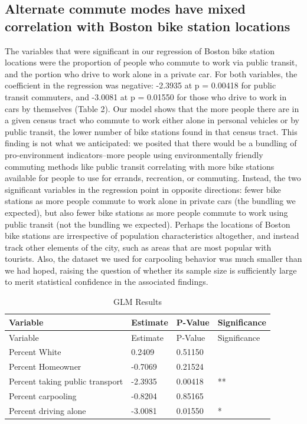\documentclass[
  12pt,
]{article}
\begin{document}
\hypertarget{alternate-commute-modes-have-mixed-correlation-with-boston-bike-station-locations}{%
\subsection{Alternate commute modes have mixed correlation with Boston
bike station
locations}\label{alternate-commute-modes-have-mixed-correlation-with-boston-bike-station-locations}}

The variables that were significant in our regression of Boston bike
station locations were the proportion of people who commute to work via
public transit, and the portion who drive to work alone in a private
car. For both variables, the coefficient in the regression was negative:
-2.3935 at p = 0.00418 for public transit commuters, and -3.0081 at p =
0.01550 for those who drive to work in cars by themselves (Table 2). Our
model shows that the more people there are in a given census tract who
commute to work either alone in personal vehicles or by public transit,
the lower number of bike stations found in that census tract. This
finding is not what we anticipated: we posited that there would be a
bundling of pro-environment indicators--more people using
environmentally friendly commuting methods like public transit
correlating with more bike stations available for people to use for
errands, recreation, or commuting. Instead, the two significant
variables in the regression point in opposite directions: fewer bike
stations as more people commute to work alone in private cars (the
bundling we expected), but also fewer bike stations as more people
commute to work using public transit (not the bundling we expected).
Perhaps the locations of Boston bike stations are irrespective of
population characteristics altogether, and instead track other elements
of the city, such as areas that are most popular with tourists. Also,
the dataset we used for carpooling behavior was much smaller than we had
hoped, raising the question of whether its sample size is sufficiently
large to merit statistical confidence in the associated findings.

\begin{longtable}[]{@{}llll@{}}
\caption{GLM Results}\tabularnewline
\toprule
Variable & Estimate & P-Value & Significance \\
\midrule
\endfirsthead
\toprule
Variable & Estimate & P-Value & Significance \\
\midrule
\endhead
Percent White & 0.2409 & 0.51150 & \\
Percent Homeowner & -0.7069 & 0.21524 & \\
Percent taking public transport & -2.3935 & 0.00418 & ** \\
Percent carpooling & -0.8204 & 0.85165 & \\
Percent driving alone & -3.0081 & 0.01550 & * \\
\bottomrule
\end{longtable}
\end{document}

